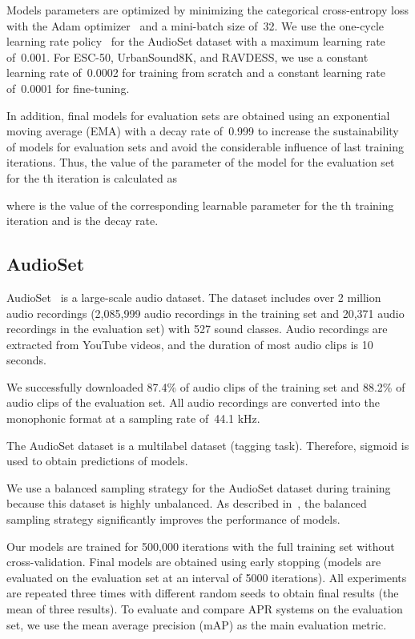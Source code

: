 \documentclass{article}
\begin{document}
\begin{sloppy}
Models parameters are optimized by minimizing the categorical cross-entropy loss with the Adam optimizer~\cite{DBLP:journals/corr/KingmaB14} and a mini-batch size of~32. We use the one-cycle learning rate policy~\cite{smith2018superconvergence} for the AudioSet dataset with a maximum learning rate of~0.001. For \hbox{ESC-50}, UrbanSound8K, and RAVDESS, we use a constant learning rate of~0.0002 for training from scratch and a constant learning rate of~0.0001 for fine-tuning. 

In addition, final models for evaluation sets are obtained using an exponential moving average (EMA) with a decay rate of~0.999 to increase the sustainability of models for evaluation sets and avoid the considerable influence of last training iterations. Thus, the value of the parameter  of the model for the evaluation set for the th iteration is calculated as

where  is the value of the corresponding learnable parameter for the th training iteration and  is the decay rate.

\subsection{AudioSet}
\setlength{\parindent}{3.0ex}
AudioSet~\cite{7952261} is a large-scale audio dataset. The dataset includes over 2 million audio recordings (2,085,999 audio recordings in the training set and 20,371 audio recordings in the evaluation set) with 527 sound classes. Audio recordings are extracted from YouTube videos, and the duration of most audio clips is 10 seconds. 

We successfully downloaded 87.4\% of audio clips of the training set and 88.2\% of audio clips of the evaluation set. All audio recordings are converted into the monophonic format at a sampling rate of~44.1 kHz.

The AudioSet dataset is a multilabel dataset (tagging task). Therefore, sigmoid is used to obtain predictions of models.

We use a balanced sampling strategy for the AudioSet dataset during training~\cite{9229505} because this dataset is highly unbalanced. As described in~\cite{9229505}, the balanced sampling strategy significantly improves the performance of models.

Our models are trained for 500,000 iterations with the full training set without cross-validation. Final models are obtained using early stopping (models are evaluated on the evaluation set at an interval of 5000 iterations). All experiments are repeated three times with different random seeds to obtain final results (the mean of three results). To evaluate and compare APR systems on the evaluation set, we use the mean average precision (mAP) as the main evaluation metric. 


\end{sloppy}
\end{document}
